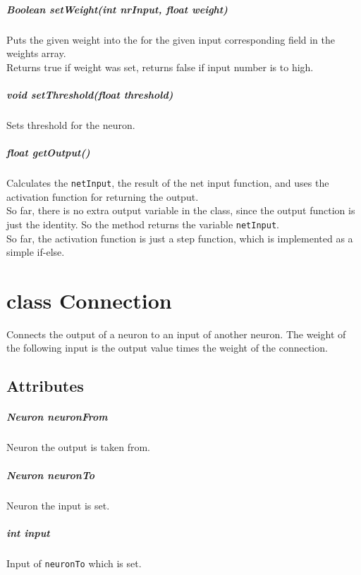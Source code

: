 \paragraph{Boolean setWeight(int nrInput, float weight)}
Puts the given weight into the for the given input corresponding field in the weights array.\\
Returns true if weight was set, returns false if input number is to high.

\paragraph{void setThreshold(float threshold)}
Sets threshold for the neuron.

\paragraph{float getOutput()}
Calculates the \texttt{netInput}, the result of the net input function, and uses the activation function for returning the output.\\
So far, there is no extra output variable in the class, since the output function is just the identity. So the method returns the variable \texttt{netInput}.\\
So far, the activation function is just a step function, which is implemented as a simple if-else.

\chapter{class Connection}
Connects the output of a neuron to an input of another neuron. The weight of the following input is the output value times the weight of the connection.

\section{Attributes}
\paragraph{Neuron neuronFrom}
Neuron the output is taken from.

\paragraph{Neuron neuronTo}
Neuron the input is set.

\paragraph{int input}
Input of \texttt{neuronTo} which is set.

